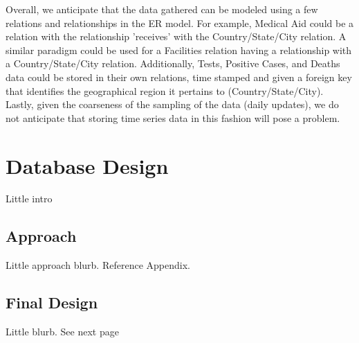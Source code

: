 \documentclass[11pt]{article}
\begin{document}
\noindent
Overall, we anticipate that the data gathered can be modeled using a few relations and relationships in the ER model. For example, Medical Aid could be a relation with the relationship 'receives' with the Country/State/City relation. A similar paradigm could be used for a Facilities relation having a relationship with a Country/State/City relation. Additionally, Tests, Positive Cases, and Deaths data could be stored in their own relations, time stamped and given a foreign key that identifies the geographical region it pertains to (Country/State/City). Lastly, given the coarseness of the sampling of the data (daily updates), we do not anticipate that storing time series data in this fashion will pose a problem.



\pagebreak

\section{Database Design}

\noindent
Little intro

\subsection{Approach}

\noindent
Little approach blurb. Reference Appendix.

\subsection{Final Design}

\noindent
Little blurb. See next page

\pagebreak
\end{document}
